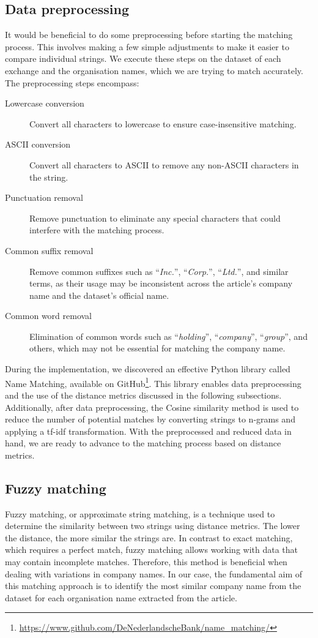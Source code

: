 \subsection{Data preprocessing}
\label{subsec:data-processing}
It would be beneficial to do some preprocessing before starting the matching process. This involves making a few simple adjustments to make it easier to compare individual strings. We execute these steps on the dataset of each exchange and the organisation names, which we are trying to match accurately. The preprocessing steps encompass:

\begin{description}
    \item[Lowercase conversion] Convert all characters to lowercase to ensure case-insensitive matching.
    \item[ASCII conversion] Convert all characters to ASCII to remove any non-ASCII characters in the string.
    \item[Punctuation removal] Remove punctuation to eliminate any special characters that could interfere with the matching process.
    \item[Common suffix removal] Remove common suffixes such as ``\textit{Inc.}'', ``\textit{Corp.}'', ``\textit{Ltd.}'', and similar terms, as their usage may be inconsistent across the article's company name and the dataset's official name.
    \item[Common word removal] Elimination of common words such as ``\textit{holding}'', ``\textit{company}'', ``\textit{group}'', and others, which may not be essential for matching the company name.
\end{description}

During the implementation, we discovered an effective Python library called Name Matching, available on GitHub\footnote{\href{https://www.github.com/DeNederlandscheBank/name\_matching/}{https://www.github.com/DeNederlandscheBank/name\_matching/}}. This library enables data preprocessing and the use of the distance metrics discussed in the following subsections. Additionally, after data preprocessing, the Cosine similarity method is used to reduce the number of potential matches by converting strings to n-grams and applying a \acrshort{tf-idf} transformation. With the preprocessed and reduced data in hand, we are ready to advance to the matching process based on distance metrics.

\subsection{Fuzzy matching}
\label{subsec:fuzzy-matching}
Fuzzy matching, or approximate string matching, is a technique used to determine the similarity between two strings using distance metrics. The lower the distance, the more similar the strings are. In contrast to exact matching, which requires a perfect match, fuzzy matching allows working with data that may contain incomplete matches. Therefore, this method is beneficial when dealing with variations in company names. In our case, the fundamental aim of this matching approach is to identify the most similar company name from the dataset for each organisation name extracted from the article.

